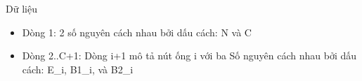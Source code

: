 Dữ liệu
\begin{itemize}
	\item     Dòng 1: 2 số nguyên cách nhau bởi dấu cách: N và C   
	\item     Dòng 2..C+1: Dòng i+1 mô tả nút ống i với ba         Số nguyên cách nhau bởi dấu cách: E\_i, B1\_i, và B2\_i   
\end{itemize}